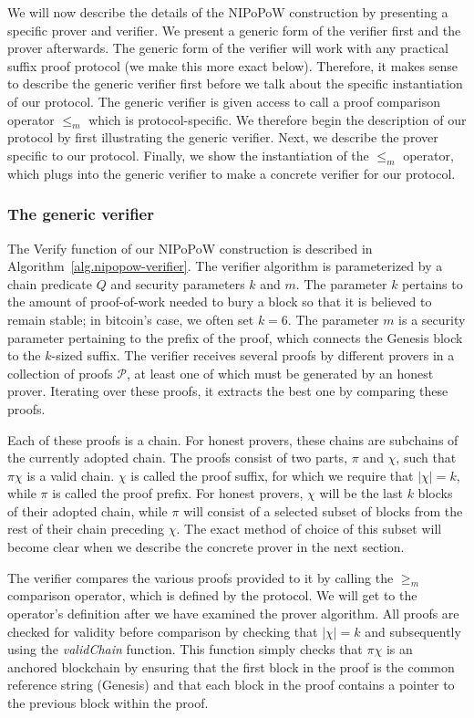 We will now describe the details of the NIPoPoW construction by presenting a
specific prover and verifier. We present a generic form of the verifier first
and the prover afterwards. The generic form of the verifier will work with any
practical suffix proof protocol (we make this more exact below). Therefore, it
makes sense to describe the generic verifier first before we talk about the
specific instantiation of our protocol. The generic verifier is given access to
call a proof comparison operator $\leq_m$ which is protocol-specific. We
therefore begin the description of our protocol by first illustrating the
generic verifier. Next, we describe the prover specific to our protocol.
Finally, we show the instantiation of the $\leq_m$ operator, which plugs into
the generic verifier to make a concrete verifier for our protocol.

\subsubsection{The generic verifier}

The \textsf{Verify} function of our NIPoPoW construction is described in
Algorithm~\ref{alg.nipopow-verifier}. The verifier algorithm is parameterized by
a chain predicate $Q$ and security parameters $k$ and $m$. The parameter $k$
pertains to the amount of proof-of-work needed to bury a block so that it is
believed to remain stable; in bitcoin's case, we often set $k = 6$. The
parameter $m$ is a security parameter pertaining to the prefix of the proof,
which connects the Genesis block to the $k$-sized suffix.  The verifier receives
several proofs by different provers in a collection of proofs $\mathcal{P}$, at
least one of which must be generated by an honest prover. Iterating over these
proofs, it extracts the best one by comparing these proofs.

Each of these proofs is a chain. For honest provers, these
chains are subchains of the currently adopted chain. The proofs consist of two
parts, $\pi$ and $\chi$, such that $\pi \chi$ is a valid chain. $\chi$ is called
the proof suffix, for which we require that $|\chi| = k$, while $\pi$ is called
the proof prefix. For honest provers, $\chi$ will be the last $k$ blocks of
their adopted chain, while $\pi$ will consist of a selected subset of blocks
from the rest of their chain preceding $\chi$. The exact method of choice of
this subset will become clear when we describe the concrete prover in the next
section.

The verifier compares the various proofs provided to it by calling the $\geq_m$
comparison operator, which is defined by the protocol. We will get to the
operator's definition after we have examined the prover algorithm. All proofs
are checked for validity before comparison by checking that $|\chi| = k$ and
subsequently using the \textit{validChain} function. This function simply checks
that $\pi\chi$ is an anchored blockchain by ensuring that the first block in the
proof is the common reference string (Genesis) and that each block in the proof
contains a pointer to the previous block within the proof.

